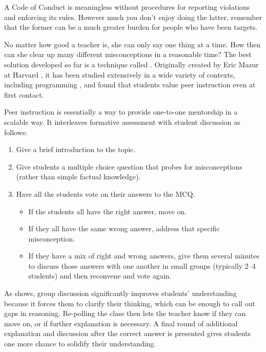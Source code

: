 A Code of Conduct is meaningless without procedures for reporting
violations and enforcing its rules. However much you don't enjoy doing
the latter, remember that the former can be a much greater burden for
people who have been targets.


No matter how good a teacher is, she can only say one thing at a time.
How then can she clear up many different misconceptions in a reasonable
time? The best solution developed so far is a technique called
. Originally created
by Eric Mazur at Harvard \cite{Mazu1996}, it has been studied
extensively in a wide variety of contexts, including programming
\cite{Crou2001,Port2013}, and \cite{Port2016} found that students
value peer instruction even at first contact.

Peer instruction is essentially a way to provide one-to-one mentorship
in a scalable way. It interleaves formative assessment with student
discussion as follows:

\begin{enumerate}
\item
  Give a brief introduction to the topic.
\item
  Give students a multiple choice question that probes for
  misconceptions (rather than simple factual knowledge).
\item
  Have all the students vote on their answers to the MCQ.

  \begin{itemize}
  \item
    If the students all have the right answer, move on.
  \item
    If they all have the same wrong answer, address that specific
    misconception.
  \item
    If they have a mix of right and wrong answers, give them several
    minutes to discuss those answers with one another in small
    groups (typically 2--4 students) and then reconvene and vote
    again.
  \end{itemize}
\end{enumerate}

As  shows, group discussion significantly
improves students' understanding because it forces them to clarify
their thinking, which can be enough to call out gaps in
reasoning. Re-polling the class then lets the teacher know if they can
move on, or if further explanation is necessary. A final round of
additional explanation and discussion after the correct answer is
presented gives students one more chance to solidify their
understanding.

